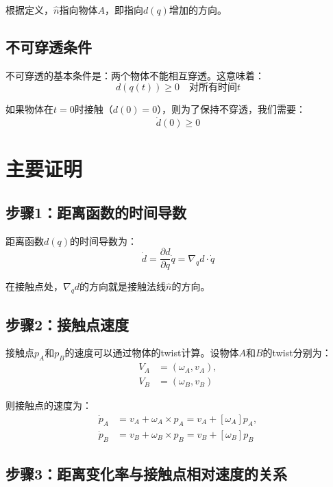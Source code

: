 \documentclass[12pt,a4paper]{article}
\begin{document}
根据定义，$\hat{n}$指向物体$A$，即指向$d(q)$增加的方向。

\subsection{不可穿透条件}

不可穿透的基本条件是：两个物体不能相互穿透。这意味着：
\begin{equation}
d(q(t)) \geq 0 \quad \text{对所有时间$t$}
\end{equation}

如果物体在$t=0$时接触（$d(0) = 0$），则为了保持不穿透，我们需要：
\begin{equation}
\dot{d}(0) \geq 0
\end{equation}

\section{主要证明}

\subsection{步骤1：距离函数的时间导数}

距离函数$d(q)$的时间导数为：
\begin{equation}
\dot{d} = \frac{\partial d}{\partial q} \dot{q} = \nabla_q d \cdot \dot{q}
\label{eq:dot_d}
\end{equation}

在接触点处，$\nabla_q d$的方向就是接触法线$\hat{n}$的方向。

\subsection{步骤2：接触点速度}

接触点$p_A$和$p_B$的速度可以通过物体的twist计算。设物体$A$和$B$的twist分别为：
\begin{align}
V_A &= (\omega_A, v_A), \\
V_B &= (\omega_B, v_B)
\end{align}

则接触点的速度为：
\begin{align}
\dot{p}_A &= v_A + \omega_A \times p_A = v_A + [\omega_A] p_A, \\
\dot{p}_B &= v_B + \omega_B \times p_B = v_B + [\omega_B] p_B
\label{eq:contact_velocities}
\end{align}

\subsection{步骤3：距离变化率与接触点相对速度的关系}
\end{document}
